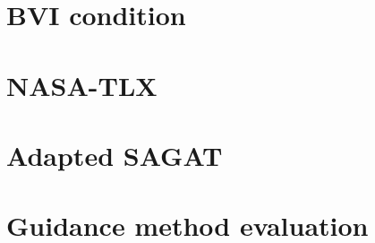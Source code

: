 

\section{BVI condition}
\label{sec:bvi_condition}
\vspace{0.25in}



\section{NASA-TLX}
\label{apsec:nasa_tlx}


\pagebreak

\section{Adapted SAGAT}
\label{apsec:sagat}


\pagebreak

\section{Guidance method evaluation}
\label{apsec:guidace_evaluation}

